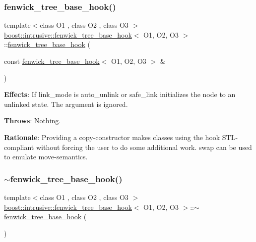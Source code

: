 \subsubsection{\texorpdfstring{fenwick\+\_\+tree\+\_\+base\+\_\+hook()}{fenwick\_tree\_base\_hook()}\hspace{0.1cm}{\footnotesize\ttfamily [2/2]}}
{\footnotesize\ttfamily template$<$class O1 , class O2 , class O3 $>$ \\
\hyperlink{classboost_1_1intrusive_1_1fenwick__tree__base__hook}{boost\+::intrusive\+::fenwick\+\_\+tree\+\_\+base\+\_\+hook}$<$ O1, O2, O3 $>$\+::\hyperlink{classboost_1_1intrusive_1_1fenwick__tree__base__hook}{fenwick\+\_\+tree\+\_\+base\+\_\+hook} (\begin{DoxyParamCaption}\item[{const \hyperlink{classboost_1_1intrusive_1_1fenwick__tree__base__hook}{fenwick\+\_\+tree\+\_\+base\+\_\+hook}$<$ O1, O2, O3 $>$ \&}]{ }\end{DoxyParamCaption})}

{\bfseries Effects}\+: If link\+\_\+mode is {\ttfamily auto\+\_\+unlink} or {\ttfamily safe\+\_\+link} initializes the node to an unlinked state. The argument is ignored.

{\bfseries Throws}\+: Nothing.

{\bfseries Rationale}\+: Providing a copy-\/constructor makes classes using the hook S\+T\+L-\/compliant without forcing the user to do some additional work. {\ttfamily swap} can be used to emulate move-\/semantics. \mbox{\label{classboost_1_1intrusive_1_1fenwick__tree__base__hook_ac723f9207f2c9f6a31fb2b22ad01c470}} 
\subsubsection{\texorpdfstring{$\sim$fenwick\+\_\+tree\+\_\+base\+\_\+hook()}{~fenwick\_tree\_base\_hook()}}
{\footnotesize\ttfamily template$<$class O1 , class O2 , class O3 $>$ \\
\hyperlink{classboost_1_1intrusive_1_1fenwick__tree__base__hook}{boost\+::intrusive\+::fenwick\+\_\+tree\+\_\+base\+\_\+hook}$<$ O1, O2, O3 $>$\+::$\sim$\hyperlink{classboost_1_1intrusive_1_1fenwick__tree__base__hook}{fenwick\+\_\+tree\+\_\+base\+\_\+hook} (\begin{DoxyParamCaption}{ }\end{DoxyParamCaption})}


